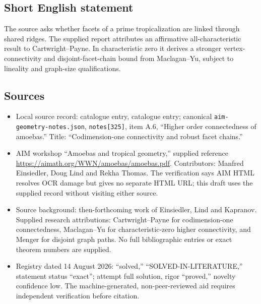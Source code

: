 \documentclass[11pt]{article}
\begin{document}
\subsection{Short English statement}
The source asks whether facets of a prime tropicalization are linked through shared ridges. The supplied report attributes an affirmative all-characteristic result to Cartwright--Payne. In characteristic zero it derives a stronger vertex-connectivity and disjoint-facet-chain bound from Maclagan--Yu, subject to lineality and graph-size qualifications.
\subsection{Sources}
\begin{itemize}
\item Local source record: catalogue entry, catalogue entry; canonical \texttt{aim-geometry-notes.json}, \texttt{notes[325]}, item A.6, ``Higher order connectedness of amoebas.'' Title: ``Codimension-one connectivity and robust facet chains.''
\item AIM workshop ``Amoebas and tropical geometry,'' supplied reference \url{https://aimath.org/WWN/amoebas/amoebas.pdf}. Contributors: Manfred Einsiedler, Doug Lind and Rekha Thomas. The verification says AIM HTML resolves OCR damage but gives no separate HTML URL; this draft uses the supplied record without visiting either source.
\item Source background: then-forthcoming work of Einsiedler, Lind and Kapranov. Supplied research attributions: Cartwright--Payne for codimension-one connectedness, Maclagan--Yu for characteristic-zero higher connectivity, and Menger for disjoint graph paths. No full bibliographic entries or exact theorem numbers are supplied.
\item Registry dated 14 August 2026: ``solved,'' ``SOLVED-IN-LITERATURE,'' statement status ``exact''; attempt full solution, rigor ``proved,'' novelty confidence low. The machine-generated, non-peer-reviewed aid requires independent verification before citation.
\end{itemize}
\end{document}
